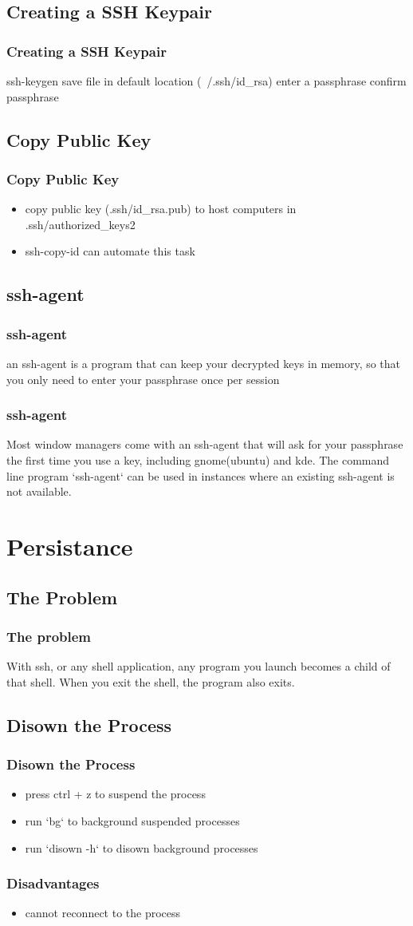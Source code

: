 \documentclass[hyperref={pdfpagelabels=false}]{beamer}
\begin{document}
\subsection{Creating a SSH Keypair}
\begin{frame}[fragile]
    \frametitle{Creating a SSH Keypair}
\begin{semiverbatim}
ssh-keygen
save file in default location (~/.ssh/id\_rsa)
enter a passphrase
confirm passphrase
\end{semiverbatim}
\end{frame}
\subsection{Copy Public Key}
\frame
{
    \frametitle{Copy Public Key}
    \begin{itemize}
    \item{copy public key (.ssh/id\_rsa.pub) to host computers in .ssh/authorized\_keys2}
    \item{ssh-copy-id can automate this task}
    \end{itemize}
}
\subsection{ssh-agent}
\frame
{
    \frametitle{ssh-agent}
    an ssh-agent is a program that can keep your decrypted keys in memory, so that you only need to enter your passphrase once per session
}
\frame
{
    \frametitle{ssh-agent}
    Most window managers come with an ssh-agent that will ask for your passphrase the first time you use a key, including gnome(ubuntu) and kde.  The command line program `ssh-agent` can be used in instances where an existing ssh-agent is not available.
}
\section{Persistance}
\subsection{The Problem}
\frame
{
    \frametitle{The problem}
    With ssh, or any shell application, any program you launch becomes a child of that shell.  When you exit the shell, the program also exits.

}
\subsection{Disown the Process}
\frame
{
  \frametitle{Disown the Process}
  \begin{itemize}
  \item{press ctrl + z to suspend the process}
  \item{run `bg` to background suspended processes}
  \item{run `disown -h` to disown background processes}
  \end{itemize}
}
\frame
{
    \frametitle{Disadvantages}
    \begin{itemize}
    \item{cannot reconnect to the process}
    \end{itemize}
}
\end{document}

